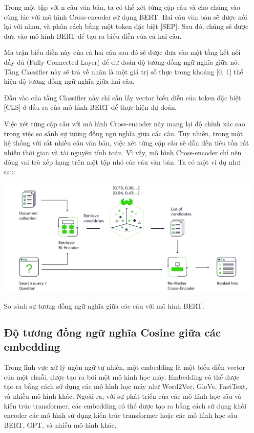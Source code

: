 \documentclass[a4paper, 12pt, openany]{book}
\begin{document}
Trong một tập với n câu văn bản, ta có thể xét từng cặp câu và cho chúng vào cùng lúc với mô hình Cross-encoder sử dụng BERT.
Hai câu văn bản sẽ được nối lại với nhau, và phân cách bằng một token đặc biệt [SEP]. Sau đó, chúng sẽ được đưa vào mô hình BERT để tạo ra biểu diễn của cả hai câu.

Ma trận biểu diễn này của cả hai câu sau đó sẽ được đưa vào một tầng kết nối đầy đủ (Fully Connected Layer) để dự đoán độ tương đồng ngữ nghĩa giữa nó.
Tầng Classifier này sẽ trả về nhãn là một giá trị số thực trong khoảng [0, 1] thể hiện độ tương đồng ngữ nghĩa giữa hai câu.

Đầu vào của tầng Classifier này chỉ cần lấy vector biểu diễn của token đặc biệt [CLS] ở đầu ra của mô hình BERT để thực hiện dự đoán.

Việc xét từng cặp câu với mô hình Cross-encoder này
mang lại độ chính xác cao trong việc so sánh sự tương đồng ngữ nghĩa giữa các câu. Tuy nhiên, trong một hệ thống với rất nhiều câu văn bản, việc xét từng cặp câu sẽ dẫn đến tiêu tốn rất nhiều thời gian và
tài nguyên tính toán. Vì vậy, mô hình Cross-encoder chỉ nên đóng vai trò xếp hạng trên một tập nhỏ các câu văn bản. Ta có một ví dụ như sau:

\begin{minipage}{\linewidth}
    \captionsetup{type=figure}
    \centering
    \includegraphics[width=.8\linewidth]{./assets/images/weaviate-pipeline-long.png}
    \caption{So sánh sự tương đồng ngữ nghĩa giữa các câu với mô hình BERT.}
\end{minipage}
\vspace{0.5cm}


\subsection{Độ tương đồng ngữ nghĩa Cosine giữa các embedding}

Trong lĩnh vực xử lý ngôn ngữ tự nhiên, một embedding là một biểu diễn vector của một chuỗi, được tạo ra bởi một mô hình học máy. Embedding có thể được tạo ra bằng cách sử dụng các mô hình học máy như Word2Vec, GloVe, FastText, và nhiều mô hình khác.
Ngoài ra, với sự phát triển của các mô hình học sâu và kiến trúc transformer, các embedding có thể được tạo ra bằng cách sử dụng khối encoder các mô hình sử dụng kiến trúc transformer hoặc các mô hình học sâu BERT, GPT, và nhiều mô hình khác.
\end{document}
